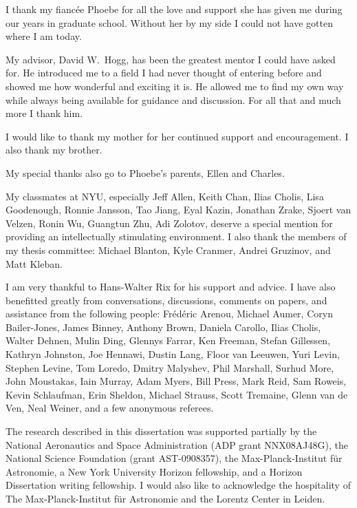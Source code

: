 I thank my fianc\'{e}e Phoebe for all the love and support she has
given me during our years in graduate school. Without her by my side I
could not have gotten where I am today.

My advisor, David W.~Hogg, has been the greatest mentor I could have
asked for. He introduced me to a field I had never thought of entering
before and showed me how wonderful and exciting it is. He allowed me
to find my own way while always being available for guidance and
discussion. For all that and much more I thank him.

I would like to thank my mother for her continued support and
encouragement. I also thank my brother.

My special thanks also go to Phoebe's parents, Ellen and Charles.

My classmates at NYU, especially Jeff Allen, Keith Chan, Ilias Cholis,
Lisa Goodenough, Ronnie Jansson, Tao Jiang, Eyal Kazin, Jonathan
Zrake, Sjoert van Velzen, Ronin Wu, Guangtun Zhu, Adi Zolotov, deserve
a special mention for providing an intellectually stimulating
environment. I also thank the members of my thesis committee: Michael
Blanton, Kyle Cranmer, Andrei Gruzinov, and Matt Kleban.

I am very thankful to Hans-Walter Rix for his support and advice. I
have also benefitted greatly from conversations, discussions, comments
on papers, and assistance from the following people: Fr{\'e}d{\'e}ric
Arenou, Michael Aumer, Coryn Bailer-Jones, James Binney, Anthony
Brown, Daniela Carollo, Ilias Cholis, Walter Dehnen, Mulin Ding,
Glennys Farrar, Ken Freeman, Stefan Gillessen, Kathryn Johnston, Joe
Hennawi, Dustin Lang, Floor van Leeuwen, Yuri Levin, Stephen Levine,
Tom Loredo, Dmitry Malyshev, Phil Marshall, Surhud More, John
Moustakas, Iain Murray, Adam Myers, Bill Press, Mark Reid, Sam Roweis,
Kevin Schlaufman, Erin Sheldon, Michael Strauss, Scott Tremaine, Glenn
van de Ven, Neal Weiner, and a few anonymous referees.

The research described in this dissertation was supported partially by
the National Aeronautics and Space Administration (ADP grant
NNX08AJ48G), the National Science Foundation (grant AST-0908357), the
Max-Planck-Institut f\"ur Astronomie, a New York University Horizon
fellowship, and a Horizon Dissertation writing fellowship. I would
also like to acknowledge the hospitality of The Max-Planck-Institut
f\"ur Astronomie and the Lorentz Center in Leiden.



